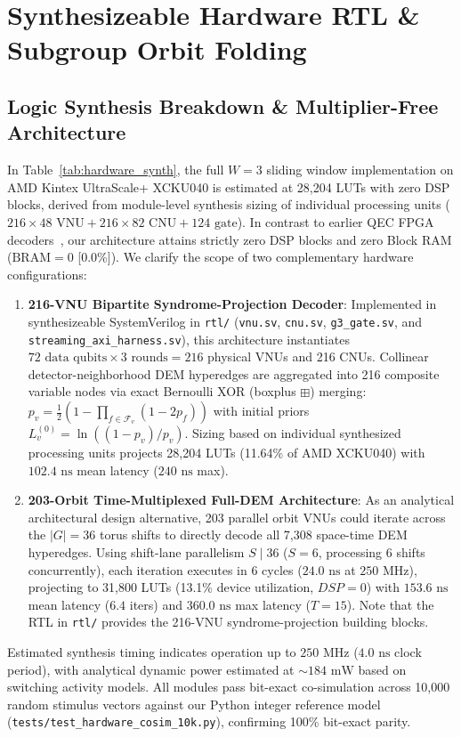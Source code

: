 \documentclass[journal]{IEEEtran}
\begin{document}
\section{Synthesizeable Hardware RTL \& Subgroup Orbit Folding}

\subsection{Logic Synthesis Breakdown \& Multiplier-Free Architecture}
In Table~\ref{tab:hardware_synth}, the full $W=3$ sliding window implementation on AMD Kintex UltraScale+ XCKU040 is estimated at 28,204 LUTs with zero DSP blocks, derived from module-level synthesis sizing of individual processing units ($216 \times 48\text{ VNU} + 216 \times 82\text{ CNU} + 124\text{ gate}$). In contrast to earlier QEC FPGA decoders~\cite{das2022afs,ueno2022qec}, our architecture attains strictly zero DSP blocks and zero Block RAM ($\text{BRAM} = 0$ [0.0\%]). We clarify the scope of two complementary hardware configurations:
\begin{enumerate}
    \item \textbf{216-VNU Bipartite Syndrome-Projection Decoder}: Implemented in synthesizeable SystemVerilog in \texttt{rtl/} (\texttt{vnu.sv}, \texttt{cnu.sv}, \texttt{g3_gate.sv}, and \texttt{streaming_axi_harness.sv}), this architecture instantiates $72 \text{ data qubits} \times 3 \text{ rounds} = 216$ physical VNUs and 216 CNUs. Collinear detector-neighborhood DEM hyperedges are aggregated into 216 composite variable nodes via exact Bernoulli XOR (boxplus $\boxplus$) merging: $p_v = \frac{1}{2}(1 - \prod_{f \in \mathcal{F}_v}(1 - 2p_f))$ with initial priors $L_v^{(0)} = \ln((1 - p_v)/p_v)$. Sizing based on individual synthesized processing units projects 28,204 LUTs (11.64\% of AMD XCKU040) with $102.4\text{ ns}$ mean latency ($240\text{ ns}$ max).
    \item \textbf{203-Orbit Time-Multiplexed Full-DEM Architecture}: As an analytical architectural design alternative, 203 parallel orbit VNUs could iterate across the $|G| = 36$ torus shifts to directly decode all 7,308 space-time DEM hyperedges. Using shift-lane parallelism $S \mid 36$ ($S=6$, processing 6 shifts concurrently), each iteration executes in 6 cycles ($24.0\text{ ns}$ at $250\text{ MHz}$), projecting to 31,800 LUTs (13.1\% device utilization, $DSP=0$) with $153.6\text{ ns}$ mean latency ($6.4$ iters) and $360.0\text{ ns}$ max latency ($T=15$). Note that the RTL in \texttt{rtl/} provides the 216-VNU syndrome-projection building blocks.
\end{enumerate}
Estimated synthesis timing indicates operation up to $250\text{ MHz}$ ($4.0\text{ ns}$ clock period), with analytical dynamic power estimated at $\sim 184\text{ mW}$ based on switching activity models. All modules pass bit-exact co-simulation across 10,000 random stimulus vectors against our Python integer reference model (\texttt{tests/test\_hardware\_cosim\_10k.py}), confirming 100\% bit-exact parity.
\end{document}
